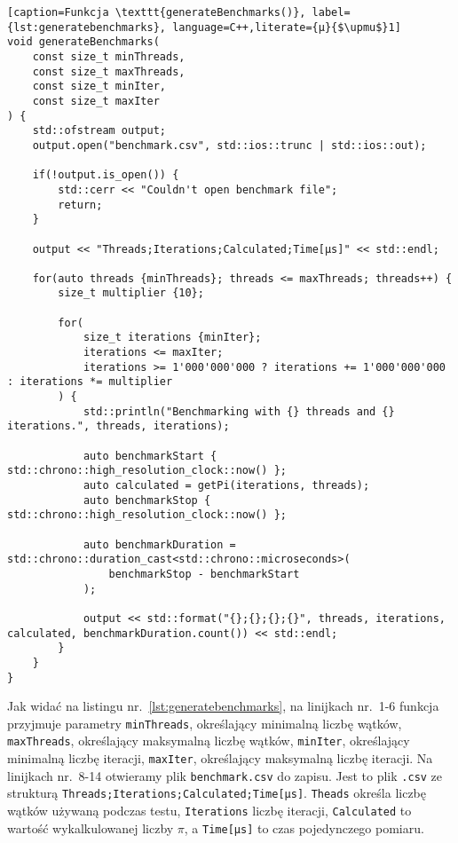 \begin{lstlisting}[caption=Funkcja \texttt{generateBenchmarks()}, label={lst:generatebenchmarks}, language=C++,literate={µ}{$\upmu$}1]
void generateBenchmarks(
	const size_t minThreads,
	const size_t maxThreads,
	const size_t minIter,
	const size_t maxIter
) {
	std::ofstream output;
	output.open("benchmark.csv", std::ios::trunc | std::ios::out);
	
	if(!output.is_open()) {
		std::cerr << "Couldn't open benchmark file";
		return;
	}

	output << "Threads;Iterations;Calculated;Time[µs]" << std::endl;

	for(auto threads {minThreads}; threads <= maxThreads; threads++) {
		size_t multiplier {10};

		for(
			size_t iterations {minIter};
			iterations <= maxIter;
			iterations >= 1'000'000'000 ? iterations += 1'000'000'000 : iterations *= multiplier
		) {
			std::println("Benchmarking with {} threads and {} iterations.", threads, iterations);

			auto benchmarkStart { std::chrono::high_resolution_clock::now() };
			auto calculated = getPi(iterations, threads);
			auto benchmarkStop { std::chrono::high_resolution_clock::now() };

			auto benchmarkDuration = std::chrono::duration_cast<std::chrono::microseconds>(
				benchmarkStop - benchmarkStart
			);

			output << std::format("{};{};{};{}", threads, iterations, calculated, benchmarkDuration.count()) << std::endl;
		}
	}
}
\end{lstlisting}
Jak widać na listingu nr.~\ref{lst:generatebenchmarks}, na linijkach nr.~1-6 funkcja przyjmuje parametry \texttt{minThreads}, określający minimalną liczbę wątków, \texttt{maxThreads}, określający maksymalną liczbę wątków, \texttt{minIter}, określający minimalną liczbę iteracji, \texttt{maxIter}, określający maksymalną liczbę iteracji. Na linijkach nr.~8-14 otwieramy plik \texttt{benchmark.csv} do zapisu. Jest to plik \texttt{.csv} ze strukturą \texttt{Threads;Iterations;Calculated;Time[µs]}. \texttt{Theads} określa liczbę wątków używaną podczas testu, \texttt{Iterations} liczbę iteracji, \texttt{Calculated} to wartość wykalkulowanej liczby $\pi$, a \texttt{Time[µs]} to czas pojedynczego pomiaru. 

